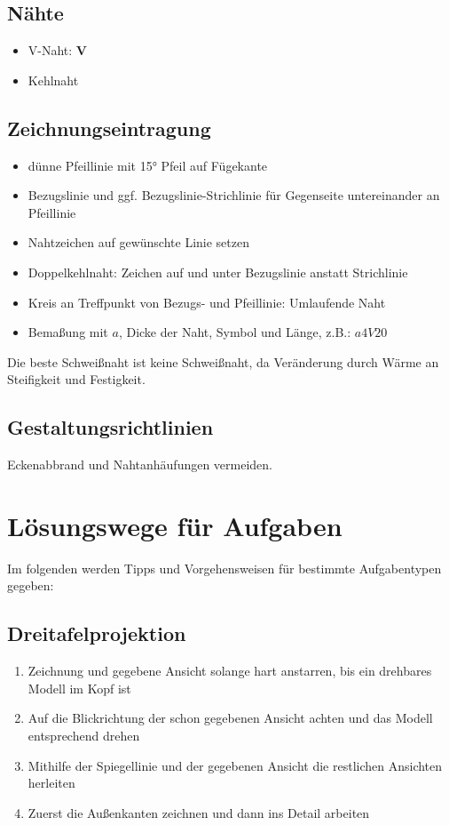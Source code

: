\documentclass[a4paper,DIV=15,fontsize=11pt]{scrartcl}
\begin{document}
\subsection{Nähte}
\begin{itemize}
	\item V-Naht: \textbf{V}
	\item Kehlnaht
\end{itemize}
	
\subsection{Zeichnungseintragung}
\begin{itemize}
	\item dünne Pfeillinie mit 15° Pfeil auf Fügekante
	\item Bezugslinie und ggf. Bezugslinie-Strichlinie für Gegenseite untereinander an Pfeillinie
	\item Nahtzeichen auf gewünschte Linie setzen
	\item Doppelkehlnaht: Zeichen auf und unter Bezugslinie anstatt Strichlinie
	\item Kreis an Treffpunkt von Bezugs- und Pfeillinie: Umlaufende Naht
	\item Bemaßung mit $a$, Dicke der Naht, Symbol und Länge, z.B.: $a4V20$
\end{itemize}
Die beste Schweißnaht ist keine Schweißnaht, da Veränderung durch Wärme an Steifigkeit und Festigkeit.

\subsection{Gestaltungsrichtlinien}
Eckenabbrand und Nahtanhäufungen vermeiden.


\section{Lösungswege für Aufgaben}
Im folgenden werden Tipps und Vorgehensweisen für bestimmte Aufgabentypen gegeben:
\subsection{Dreitafelprojektion}
\begin{enumerate}
	\item Zeichnung und gegebene Ansicht solange hart anstarren, bis ein drehbares Modell im Kopf ist
	\item Auf die Blickrichtung der schon gegebenen Ansicht achten und das Modell entsprechend drehen
	\item Mithilfe der Spiegellinie und der gegebenen Ansicht die restlichen Ansichten herleiten
	\item Zuerst die Außenkanten zeichnen und dann ins Detail arbeiten
\end{enumerate}
\end{document}

